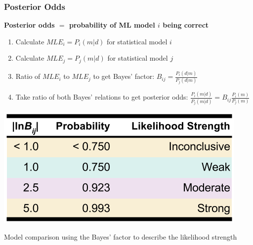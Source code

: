\begin{frame}
  \frametitle{Posterior Odds}
  \textbf{Posterior odds $=$ probability of ML model $i$ being correct}
  \vfill
  \begin{enumerate}
    \item Calculate $MLE_i = P_i (m|d)$ for statistical model $i$
    \item Calculate $MLE_j = P_j (m|d)$ for statistical model $j$
    \item Ratio of $MLE_i$ to $MLE_j$ to get Bayes' factor:
          $B_{ij} = \frac{P_i (d|m)}{P_j (d|m)}$
    \item Take ratio of both Bayes' relations to get posterior odds:
          $\frac{P_i (m|d)}{P_j (m|d)} = B_{ij} \frac{P_i(m)}{P_j (m)}$
  \end{enumerate}
  \begin{table}
    \centering
    \includegraphics[width=0.6\linewidth]{./figures/evidence-strength.png}
    \caption{Model comparison using the Bayes' factor to describe the likelihood strength \cite{gentle_bayes, bayes_compare}}
  \end{table}
\end{frame}
